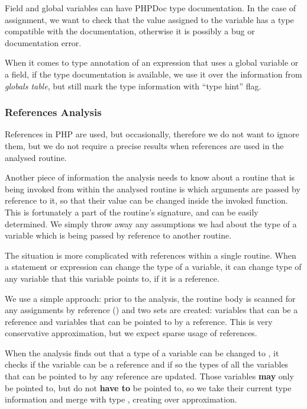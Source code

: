         Field and global variables can have PHPDoc type documentation.
        In the case of assignment, we want to check that the value assigned 
        to the variable has a type compatible with the documentation, 
        otherwise it is possibly a bug or documentation error.
        
        When it comes to type annotation of an expression that uses 
        a global variable or a field, if the type documentation is available, 
        we use it over the information from \emph{globals table}, 
        but still mark the type information with ``type hint'' flag.
        
        \subsubsection*{References Analysis}
        References in PHP are used, but occasionally, therefore we do 
        not want to ignore them, but we do not require a 
        precise results when references are used in 
        the analysed routine.
        
        Another piece of information the analysis needs to know 
        about a routine that is being invoked from within the 
        analysed routine is which arguments are passed by reference 
        to it, so that their value can be changed inside the 
        invoked function. This is fortunately a part of the 
        routine's signature, and can be easily determined. 
        We simply throw away any assumptions we had about the type 
        of a variable which is being passed by reference to 
        another routine.
        
        The situation is more complicated with references within a 
        single routine. When a statement or expression can change 
        the type of a variable, it can change type of any variable 
        that this variable points to, if it is a reference.
        
        We use a simple approach: prior to the analysis, the routine 
        body is scanned for any assignments by reference () 
        and two sets are created: variables that can be a reference and 
        variables that can be pointed to by a reference. This is very 
        conservative approximation, but we expect sparse usage of 
        references.
        
        When the analysis finds out that a type of a variable can 
        be changed to , it checks if the variable can be 
        a reference and if so the types of all the variables that 
        can be pointed to by any reference are updated. Those variables 
        \textbf{may} only be pointed to, but do not \textbf{have to} 
        be pointed to, so we take their current type information 
        and merge with type , creating over approximation.
        
